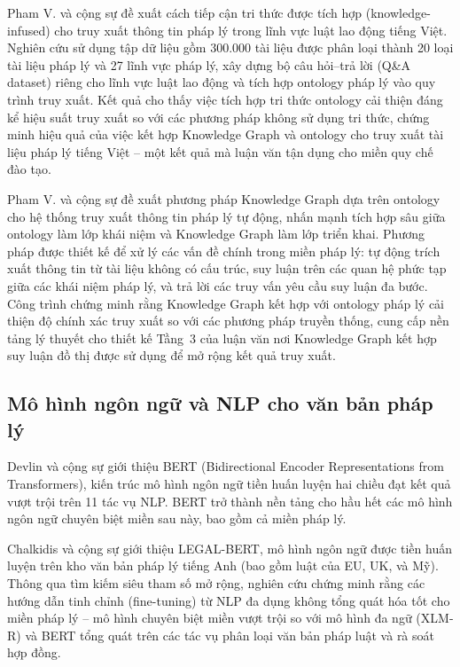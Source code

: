 Pham V. và cộng sự \cite{pham2024enhancing} đề xuất cách tiếp cận tri thức được tích
hợp (knowledge-infused) cho truy xuất thông tin pháp lý trong lĩnh vực luật lao động
tiếng Việt. Nghiên cứu sử dụng tập dữ liệu gồm 300.000 tài liệu được phân loại
thành 20 loại tài liệu pháp lý và 27 lĩnh vực pháp lý, xây dựng bộ câu hỏi--trả
lời (Q\&A dataset) riêng cho lĩnh vực luật lao động và tích hợp ontology pháp lý
vào quy trình truy xuất. Kết quả cho thấy việc tích hợp tri thức ontology cải thiện
đáng kể hiệu suất truy xuất so với các phương pháp không sử dụng tri thức, chứng
minh hiệu quả của việc kết hợp Knowledge Graph và ontology cho truy xuất tài liệu
pháp lý tiếng Việt -- một kết quả mà luận văn tận dụng cho miền quy chế đào tạo.

Pham V. và cộng sự \cite{pham2026ontology} đề xuất phương pháp Knowledge Graph dựa
trên ontology cho hệ thống truy xuất thông tin pháp lý tự động, nhấn mạnh tích hợp
sâu giữa ontology làm lớp khái niệm và Knowledge Graph làm lớp triển khai. Phương
pháp được thiết kế để xử lý các vấn đề chính trong miền pháp lý: tự động trích xuất
thông tin từ tài liệu không có cấu trúc, suy luận trên các quan hệ phức tạp giữa
các khái niệm pháp lý, và trả lời các truy vấn yêu cầu suy luận đa bước. Công
trình chứng minh rằng Knowledge Graph kết hợp với ontology pháp lý cải thiện độ
chính xác truy xuất so với các phương pháp truyền thống, cung cấp nền tảng lý thuyết
cho thiết kế Tầng~3 của luận văn nơi Knowledge Graph kết hợp suy luận đồ thị được
sử dụng để mở rộng kết quả truy xuất.

\subsection{Mô hình ngôn ngữ và NLP cho văn bản pháp lý}
\label{subsec:nlp-phap-ly}

Devlin và cộng sự \cite{devlin2019bert} giới thiệu BERT (Bidirectional Encoder
Representations from Transformers), kiến trúc mô hình ngôn ngữ tiền huấn luyện hai
chiều đạt kết quả vượt trội trên 11 tác vụ NLP. BERT trở thành nền tảng cho hầu
hết các mô hình ngôn ngữ chuyên biệt miền sau này, bao gồm cả miền pháp lý.

Chalkidis và cộng sự \cite{chalkidis2020legalbert} giới thiệu LEGAL-BERT, mô hình
ngôn ngữ được tiền huấn luyện trên kho văn bản pháp lý tiếng Anh (bao gồm luật
của EU, UK, và Mỹ). Thông qua tìm kiếm siêu tham số mở rộng, nghiên cứu chứng
minh rằng các hướng dẫn tinh chỉnh (fine-tuning) từ NLP đa dụng không tổng quát
hóa tốt cho miền pháp lý -- mô hình chuyên biệt miền vượt trội so với mô hình đa
ngữ (XLM-R) và BERT tổng quát trên các tác vụ phân loại văn bản pháp luật
và rà soát hợp đồng.

